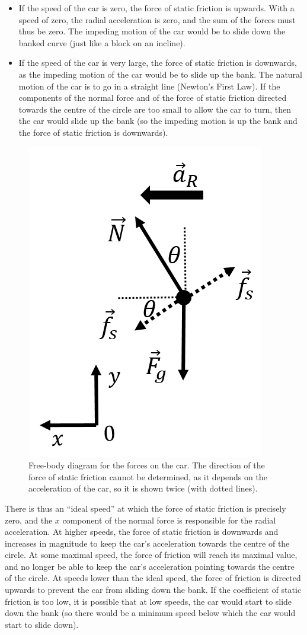 \begin{itemize}
\item If the speed of the car is zero, the force of static friction is upwards. With a speed of zero, the radial acceleration is zero, and the sum of the forces must thus be zero. The impeding motion of the car would be to slide down the banked curve (just like a block on an incline).
\item If the speed of the car is very large, the force of static friction is downwards, as the impeding motion of the car would be to slide up the bank. The natural motion of the car is to go in a straight line (Newton's First Law). If the components of the normal force and of the force of static friction directed towards the centre of the circle are too small to allow the car to turn, then the car would slide up the bank (so the impeding motion is up the bank and the force of static friction is downwards).
\end{itemize}

\begin{figure}[!htbp]
\centering
\includegraphics[width=0.3\linewidth]{files/carbank_fbd-abf6ccb44dd218cc25f1a2b082e9acd0.png}
\caption[]{Free-body diagram for the forces on the car. The direction of the force of static friction cannot be determined, as it depends on the acceleration of the car, so it is shown twice (with dotted lines).}
\label{fig:applyingnewtonslaws:carbank_fbd}
\end{figure}

There is thus an ``ideal speed'' at which the force of static friction is precisely zero, and the $x$ component of the normal force is responsible for the radial acceleration. At higher speeds, the force of static friction is downwards and increases in magnitude to keep the car's acceleration towards the centre of the circle. At some maximal  speed, the force of friction will reach its maximal value, and no longer be able to keep the car's acceleration pointing towards the centre of the circle. At speeds lower than the ideal speed, the force of friction is directed upwards to prevent the car from sliding down the bank. If the coefficient of static friction is too low, it is possible that at low speeds, the car would start to slide down the bank (so there would be a minimum speed below which the car would start to slide down).


